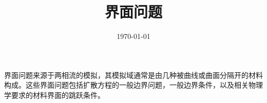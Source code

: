 \documentclass[UTF8,titlepage]{ctexart}
\title{界面问题}
\date{\today}
\begin{document}
\maketitle

界面问题来源于两相流的模拟，其模拟域通常是由几种被曲线或曲面分隔开的材料构成。这些界面问题包括扩散方程的一般边界问题\cite{邢亚楠2021椭圆界面问题的广义有限差分方法}，一般边界条件，以及相关物理学要求的材料界面的跳跃条件\cite{邢亚楠2021椭圆界面问题的广义有限差分方法}。

\vfill \newpage



\end{document}
